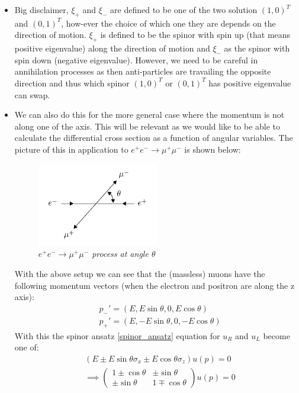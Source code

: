 \documentclass[11pt]{article}
\numberwithin{equation}{section}
\begin{document}
\begin{itemize}
\item Big disclaimer, $\xi_+$ and $\xi_-$ are defined to be one of the two solution $(1,0)^T$ and $(0,1)^T$, how-ever the choice of which one they are depends on the direction of motion. $\xi_+$ is defined to be the spinor with spin up (that means positive eigenvalue) along the direction of motion and $\xi_-$ as the spinor with spin down (negative eigenvalue). However, we need to be careful in annihilation processes as then anti-particles are travailing the opposite direction and thus which spinor $(1,0)^T$ or $(0,1)^T$ has positive eigenvalue can swap. 

\item We can also do this for the more general case where the momentum is not along one of the axis. This will be relevant as we would like to be able to calculate the differential cross section as a function of angular variables. The picture of this in application to $e^+e^- \rightarrow \mu^+\mu^-$ is shown below:
\begin{figure}[H]
\centering
\includegraphics[width=0.5\textwidth]{e_mu}
\caption{\label{scatter}\emph{$e^+e^- \rightarrow \mu^+\mu^-$ process at angle $\theta$}}
\end{figure}
With the above setup we can see that the (massless) muons have the following momentum vectors (when the electron and positron are along the z axis):
\begin{align*}
    &p_-' = (E,E\sin\theta,0,E\cos \theta)\\
    &p_+' = (E,-E\sin\theta,0,-E\cos \theta)
\end{align*}
With this the spinor ansatz \ref{spinor_ansatz} equation for $u_R$ and $u_L$ become one of:
\begin{align*}
    &(E \pm E\sin \theta \sigma_x \pm E \cos \theta \sigma_z)u(p) = 0 \\
     &\implies \begin{pmatrix}
          1\pm \cos \theta & \pm \sin \theta \\
          \pm \sin \theta & 1\mp \cos \theta 
     \end{pmatrix}u(p) = 0 

\end{align*}
\end{itemize}
\end{document}
